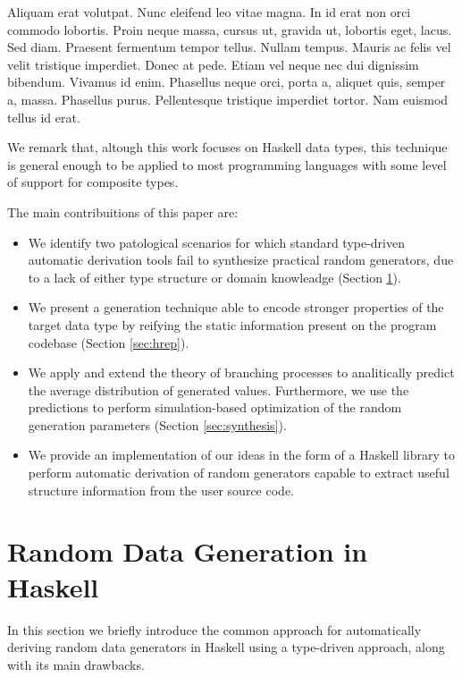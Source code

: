 \documentclass[conference, fleqn]{IEEEtran}
\begin{document}
Aliquam erat volutpat. Nunc eleifend leo vitae magna. In id erat non orci
commodo lobortis. Proin neque massa, cursus ut, gravida ut, lobortis eget,
lacus. Sed diam. Praesent fermentum tempor tellus. Nullam tempus. Mauris ac
felis vel velit tristique imperdiet. Donec at pede. Etiam vel neque nec dui
dignissim bibendum. Vivamus id enim. Phasellus neque orci, porta a, aliquet
quis, semper a, massa. Phasellus purus. Pellentesque tristique imperdiet tortor.
Nam euismod tellus id erat\cite{grieco2017}.


We remark that, altough this work focuses on Haskell data types, this technique
is general enough to be applied to most programming languages with some level of
support for composite types.


The main contribuitions of this paper are:
%
\begin{itemize}
\item We identify two patological scenarios for which standard type-driven
  automatic derivation tools fail to synthesize practical random generators, due
  to a lack of either type structure or domain knowleadge (Section
  \ref{sec:randomtesting}).
\item We present a generation technique able to encode stronger properties of
  the target data type by reifying the static information present on the program
  codebase (Section \ref{sec:hrep}).
\item We apply and extend the theory of branching processes to analitically
  predict the average distribution of generated values.
  Furthermore, we use the predictions to perform simulation-based optimization
  of the random generation parameters (Section \ref{sec:synthesis}).
\item We provide an implementation of our ideas in the form of a Haskell library
  to perform automatic derivation of random generators capable to extract useful
  structure information from the user source code.
\end{itemize}
\section{Random Data Generation in Haskell} \label{sec:randomtesting}

In this section we briefly introduce the common approach for automatically
deriving random data generators in Haskell using a type-driven approach, along
with its main drawbacks.
\end{document}
